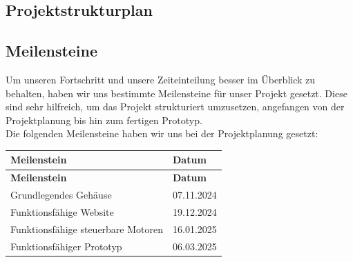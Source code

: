 \documentclass[ngerman,12pt,a4paper]{article}
\begin{document}
		\subsection{Projektstrukturplan} %
		
		\subsection{Meilensteine} %
		Um unseren Fortschritt und unsere Zeiteinteilung besser im Überblick zu behalten, haben wir uns bestimmte Meilensteine für unser Projekt gesetzt. Diese sind sehr hilfreich, um das Projekt strukturiert umzusetzen, angefangen von der Projektplanung bis hin zum fertigen Prototyp. \\[0.5cm]
		Die folgenden Meilensteine haben wir uns bei der Projektplanung gesetzt:
		\begin{longtable}{| l | l |}
			\hline
			\textbf{Meilenstein} & \textbf{Datum} \\
			\hline
			\endfirsthead
			\hline
			\textbf{Meilenstein} & \textbf{Datum} \\
			\hline
			\endhead
			\hline
			Grundlegendes Gehäuse & 07.11.2024 \\
			\hline
			Funktionsfähige Website & 19.12.2024 \\
			\hline
			Funktionsfähige steuerbare Motoren & 16.01.2025 \\
			\hline
			Funktionsfähiger Prototyp & 06.03.2025 \\
			\hline
		\end{longtable}
		\newpage
\end{document}

